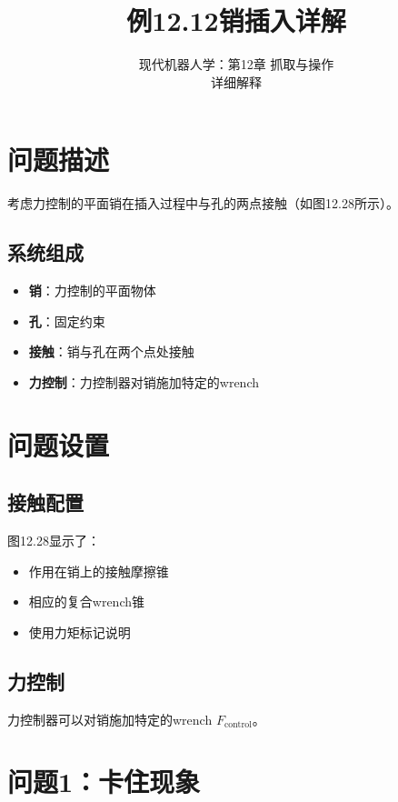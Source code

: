 \documentclass[12pt,a4paper]{article}
\title{例12.12\quad 销插入\quad 详解}
\author{现代机器人学：第12章 抓取与操作\\
详细解释}
\date{}
\begin{document}
\maketitle

\section{问题描述}

考虑力控制的平面销在插入过程中与孔的两点接触（如图12.28所示）。

\subsection{系统组成}

\begin{itemize}
    \item \textbf{销}：力控制的平面物体
    \item \textbf{孔}：固定约束
    \item \textbf{接触}：销与孔在两个点处接触
    \item \textbf{力控制}：力控制器对销施加特定的wrench
\end{itemize}

\section{问题设置}

\subsection{接触配置}

图12.28显示了：
\begin{itemize}
    \item 作用在销上的接触摩擦锥
    \item 相应的复合wrench锥
    \item 使用力矩标记说明
\end{itemize}

\subsection{力控制}

力控制器可以对销施加特定的wrench $F_{\text{control}}$。

\section{问题1：卡住现象}
\end{document}
